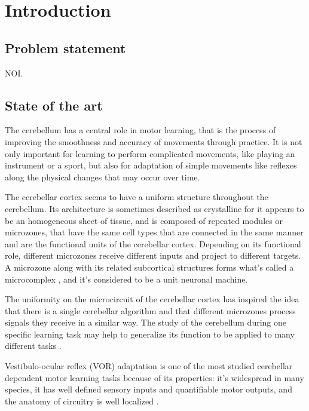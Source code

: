 \documentclass[12pt, a4paper,twoside]{tesi_upf}
\begin{document}
\mainmatter
\chapter{Introduction}

\section{Problem statement}

NOI\cite{Herreros2013b}.

\section{State of the art}

The cerebellum has a central role in motor learning, that is the process of improving the smoothness and accuracy of movements through practice. It is not only important for learning to perform complicated movements, like playing an instrument or a sport, but also for adaptation of simple movements like reflexes along the physical changes that may occur over time.

The cerebellar cortex seems to have a uniform structure throughout the cerebellum. Its architecture is sometimes described as crystalline for it appears to be an homogeneous sheet of tissue, and is composed of repeated modules or microzones, that have the same cell types that are connected in the same manner and are the functional units of the cerebellar cortex. Depending on its functional role, different microzones receive different inputs and project to different targets. A microzone along with its related subcortical structures forms what's called a microcomplex \cite{Ito1982}, and it's considered to be a unit neuronal machine.

The uniformity on the microcircuit of the cerebellar cortex has inspired the idea that there is a single cerebellar algorithm and that different microzones process signals they receive in a similar way. The study of the cerebellum during one specific learning task may help to generalize its function to be applied to many different tasks \cite{Boyden2004}.

Vestibulo-ocular reflex (VOR) adaptation is one of the most studied cerebellar dependent motor learning tasks because of its properties: it's widespread in many species, it has well defined sensory inputs and quantifiable motor outputs, and the anatomy of circuitry is well localized \cite{Ito1982}.
\end{document}
